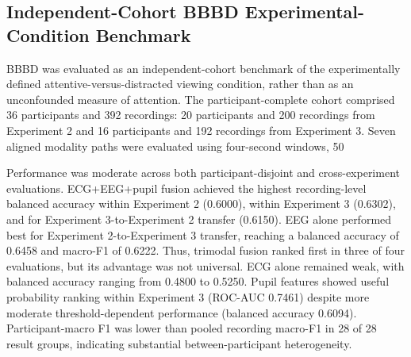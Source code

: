 \subsection{Independent-Cohort BBBD Experimental-Condition Benchmark}
\label{subsec:bbbd_external}

BBBD was evaluated as an independent-cohort benchmark of the experimentally defined attentive-versus-distracted viewing condition, rather than as an unconfounded measure of attention. The participant-complete cohort comprised 36 participants and 392 recordings: 20 participants and 200 recordings from Experiment 2 and 16 participants and 192 recordings from Experiment 3. Seven aligned modality paths were evaluated using four-second windows, 50%

Performance was moderate across both participant-disjoint and cross-experiment evaluations. ECG+EEG+pupil fusion achieved the highest recording-level balanced accuracy within Experiment 2 (0.6000), within Experiment 3 (0.6302), and for Experiment 3-to-Experiment 2 transfer (0.6150). EEG alone performed best for Experiment 2-to-Experiment 3 transfer, reaching a balanced accuracy of 0.6458 and macro-F1 of 0.6222. Thus, trimodal fusion ranked first in three of four evaluations, but its advantage was not universal. ECG alone remained weak, with balanced accuracy ranging from 0.4800 to 0.5250. Pupil features showed useful probability ranking within Experiment 3 (ROC-AUC 0.7461) despite more moderate threshold-dependent performance (balanced accuracy 0.6094). Participant-macro F1 was lower than pooled recording macro-F1 in 28 of 28 result groups, indicating substantial between-participant heterogeneity.

